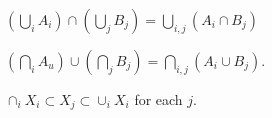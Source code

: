 \begin{proposition}
$(\bigcup_{i} A_i) \cap (\bigcup_{j} B_j) = \bigcup_{i,j}(A_i \cap B_j)$\end{proposition}
\begin{proposition}
$(\bigcap_{i} A_u) \cup (\bigcap_{j} B_j) = \bigcap_{i,j}(A_i \cup B_j).$\end{proposition}
\begin{proposition}
$\cap _i X_i \subset X_j \subset \cup_i X_i$ for each $j$.\end{proposition}
